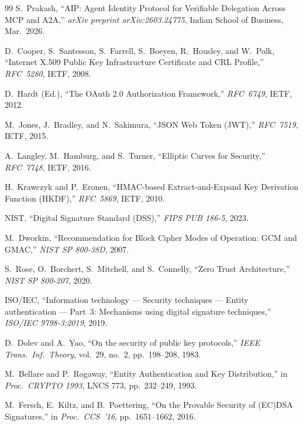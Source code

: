 \documentclass[review,5p,twocolumn,times]{elsarticle}
\begin{document}
\begin{thebibliography}{99}
S.~Prakash,
``AIP: Agent Identity Protocol for Verifiable Delegation Across
MCP and A2A,''
\textit{arXiv preprint arXiv:2603.24775}, Indian School of Business,
Mar.\ 2026.


D.~Cooper, S.~Santesson, S.~Farrell, S.~Boeyen, R.~Housley, and W.~Polk,
``Internet X.509 Public Key Infrastructure Certificate and CRL Profile,''
\textit{RFC~5280}, IETF, 2008.

D.~Hardt (Ed.),
``The OAuth 2.0 Authorization Framework,''
\textit{RFC~6749}, IETF, 2012.

M.~Jones, J.~Bradley, and N.~Sakimura,
``JSON Web Token (JWT),''
\textit{RFC~7519}, IETF, 2015.

A.~Langley, M.~Hamburg, and S.~Turner,
``Elliptic Curves for Security,''
\textit{RFC~7748}, IETF, 2016.

H.~Krawczyk and P.~Eronen,
``HMAC-based Extract-and-Expand Key Derivation Function (HKDF),''
\textit{RFC~5869}, IETF, 2010.

NIST,
``Digital Signature Standard (DSS),''
\textit{FIPS PUB 186-5}, 2023.

M.~Dworkin,
``Recommendation for Block Cipher Modes of Operation: GCM and GMAC,''
\textit{NIST SP 800-38D}, 2007.

S.~Rose, O.~Borchert, S.~Mitchell, and S.~Connelly,
``Zero Trust Architecture,''
\textit{NIST SP 800-207}, 2020.

ISO/IEC,
``Information technology --- Security techniques --- Entity authentication
--- Part~3: Mechanisms using digital signature techniques,''
\textit{ISO/IEC 9798-3:2019}, 2019.


D.~Dolev and A.~Yao,
``On the security of public key protocols,''
\textit{IEEE Trans.\ Inf.\ Theory}, vol.~29, no.~2, pp.~198--208, 1983.

M.~Bellare and P.~Rogaway,
``Entity Authentication and Key Distribution,''
in \textit{Proc.\ CRYPTO 1993}, LNCS 773, pp.~232--249, 1993.

M.~Fersch, E.~Kiltz, and B.~Poettering,
``On the Provable Security of (EC)DSA Signatures,''
in \textit{Proc.\ CCS~'16}, pp.~1651--1662, 2016.


\end{thebibliography}
\end{document}
